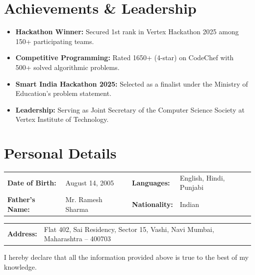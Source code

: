 \documentclass[a4paper,10pt]{article}
\begin{document}
\section*{Achievements \& Leadership}
\begin{itemize}
    \item \textbf{Hackathon Winner:} Secured 1st rank in Vertex Hackathon 2025 among 150+ participating teams.
    \item \textbf{Competitive Programming:} Rated 1650+ (4-star) on CodeChef with 500+ solved algorithmic problems.
    \item \textbf{Smart India Hackathon 2025:} Selected as a finalist under the Ministry of Education's problem statement.
    \item \textbf{Leadership:} Serving as Joint Secretary of the Computer Science Society at Vertex Institute of Technology.
\end{itemize}

\section*{Personal Details}
\noindent
\begin{tabularx}{\textwidth}{@{}l X l X@{}}
\textbf{Date of Birth:} & August 14, 2005 & \textbf{Languages:} & English, Hindi, Punjabi \\
\textbf{Father's Name:} & Mr. Ramesh Sharma & \textbf{Nationality:} & Indian \\
\end{tabularx}

\vspace{1.5mm}
\noindent
\begin{tabularx}{\textwidth}{@{}l X@{}}
\textbf{Address:} & Flat 402, Sai Residency, Sector 15, Vashi, Navi Mumbai, Maharashtra -- 400703 \\
\end{tabularx}

\vfill
\begin{center}
\small\color{subtlecolor}
I hereby declare that all the information provided above is true to the best of my knowledge.
\end{center}
\end{document}
